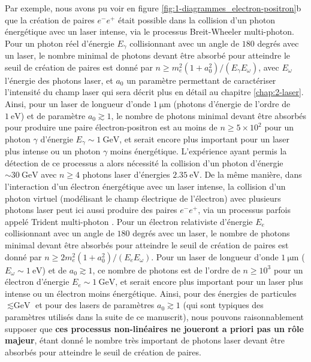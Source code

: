 \begin{refsection}
Par exemple, nous avons pu voir en figure \ref{fig:1-diagrammes_electron-positron}b que la création de paires $e^-e^+$ était possible dans la collision d'un photon énergétique avec un laser intense, via le processus Breit-Wheeler multi-photon. Pour un photon réel d'énergie $E_\gamma$ collisionnant avec un angle de $180$ degrés avec un laser, le nombre minimal de photons devant être absorbé pour atteindre le seuil de création de paires est donné par \parencite{greiner_2009} $n \ge m_e^2 (1+a_0^2)/(E_\gamma E_\omega)$, avec $E_\omega$ l'énergie des photons laser, et $a_0$ un paramètre permettant de caractériser l'intensité du champ laser qui sera décrit plus en détail au chapitre \ref{chap:2-laser}. Ainsi, pour un laser de longueur d'onde $1 ~ \si{\um}$ (photons d'énergie de l'ordre de $1 ~ \si{\eV}$) et de paramètre $a_0 \gtrsim 1$, le nombre de photons minimal devant être absorbés pour produire une paire électron-positron est au moins de $n \ge 5\times 10^2$ pour un photon $\gamma$ d'énergie $E_\gamma \sim 1 ~ \si{\GeV}$, et serait encore plus important pour un laser plus intense ou un photon $\gamma$ moins énergétique. L'expérience ayant permis la détection de ce processus \parencite{burke_1997} a alors nécessité la collision d'un photon d'énergie $\sim 30 ~ \si{\GeV}$ avec $n \ge 4$ photons laser d'énergies $2.35 ~ \si{\eV}$. De la même manière, dans l'interaction d'un électron énergétique avec un laser intense, la collision d'un photon virtuel (modélisant le champ électrique de l'électron) avec plusieurs photons laser peut ici aussi produire des paires $e^-e^+$, via un processus parfois appelé Trident multi-photon \parencite{bula_2000}. Pour un électron relativiste d'énergie $E_e$ collisionnant avec un angle de $180$ degrés avec un laser, le nombre de photons minimal devant être absorbés pour atteindre le seuil de création de paires est donné par \parencite{bula_2000} $n \ge 2 m_e^2 (1+a_0^2)/(E_e E_\omega)$. Pour un laser de longueur d'onde $1 ~ \si{\um}$ ($E_\omega \sim 1 ~ \si{\eV}$) et de $a_0 \gtrsim 1$, ce nombre de photons est de l'ordre de $n \ge 10^3$ pour un électron d'énergie $E_e \sim 1 ~ \si{\GeV}$, et serait encore plus important pour un laser plus intense ou un électron moins énergétique. Ainsi, pour des énergies de particules $\lesssim \si{\GeV}$ et pour des lasers de paramètres $a_0 \gtrsim 1$ (qui sont typiques des paramètres utilisés dans la suite de ce manuscrit), nous pouvons raisonnablement supposer que \textbf{ces processus non-linéaires ne joueront a priori pas un rôle majeur}, étant donné le nombre très important de photons laser devant être absorbés pour atteindre le seuil de création de paires.



\end{refsection}

